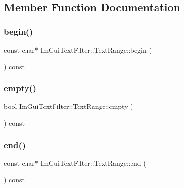 \subsection{Member Function Documentation}
\hypertarget{struct_im_gui_text_filter_1_1_text_range_ab6b04c316f081e8ad7b044a8afbda63c}{}\label{struct_im_gui_text_filter_1_1_text_range_ab6b04c316f081e8ad7b044a8afbda63c} 
\subsubsection{\texorpdfstring{begin()}{begin()}}
{\footnotesize\ttfamily const char$\ast$ Im\+Gui\+Text\+Filter\+::\+Text\+Range\+::begin (\begin{DoxyParamCaption}{ }\end{DoxyParamCaption}) const}

\hypertarget{struct_im_gui_text_filter_1_1_text_range_ab8d74e3b0ce63997746828e4b8ae3bbf}{}\label{struct_im_gui_text_filter_1_1_text_range_ab8d74e3b0ce63997746828e4b8ae3bbf} 
\subsubsection{\texorpdfstring{empty()}{empty()}}
{\footnotesize\ttfamily bool Im\+Gui\+Text\+Filter\+::\+Text\+Range\+::empty (\begin{DoxyParamCaption}{ }\end{DoxyParamCaption}) const}

\hypertarget{struct_im_gui_text_filter_1_1_text_range_aa5d60286f4c35bfdde82219ff079de9e}{}\label{struct_im_gui_text_filter_1_1_text_range_aa5d60286f4c35bfdde82219ff079de9e} 
\subsubsection{\texorpdfstring{end()}{end()}}
{\footnotesize\ttfamily const char$\ast$ Im\+Gui\+Text\+Filter\+::\+Text\+Range\+::end (\begin{DoxyParamCaption}{ }\end{DoxyParamCaption}) const}

